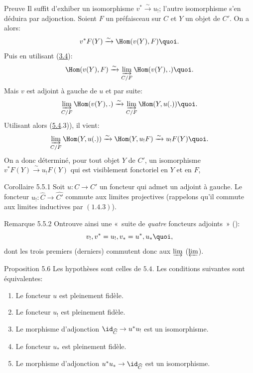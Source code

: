 \begin{enonce*}[remark]{Preuve}
Il suffit d'exhiber un isomorphisme $v^\ast\xrightarrow{\sim}
u_{!}$; l'autre isomorphisme s'en déduira par adjonction. Soient $F$
un préfaisceau sur $C$ et $Y$ un objet de $C'$. On a alors:
$$
v^\ast F(Y)\xrightarrow{\sim} \Hom(v(Y),F){\quoi}.
$$
Puis en utilisant (\hyperref[I.prop3.4]{3.4}):
$$
\Hom(v(Y),F)\xrightarrow{\sim} \varinjlim_{C/F} \Hom(v(Y),.){\quoi}.
$$
Mais $v$ est adjoint à gauche de $u$ et par suite:
$$
\varinjlim_{C/F}\Hom(v(Y),.)\xrightarrow{\sim}\varinjlim_{C/F}\Hom(Y,u(.)){\quoi}.
$$
Utilisant alors (\hyperref[I.prop5.4]{5.4}.3)), il vient:
$$
\varinjlim_{C/F}\Hom(Y,u(.))\xrightarrow{\sim}
\Hom(Y,u_{!}F)\xrightarrow{\sim} u_{!}F(Y){\quoi}.
$$
On a donc déterminé, pour tout objet $Y$ de $C'$, un isomorphisme
$v^\ast F(Y)\xrightarrow{\sim} u_{!}F(Y)$ qui est visiblement
fonctoriel en $Y$ et en $F$, \cqfd
\end{enonce*}

\begin{enonce*}{Corollaire 5.5.1}
Soit $u:C\rightarrow C'$ un foncteur qui admet un adjoint à gauche.
Le foncteur $u_{!}:\widehat{C}\rightarrow
\widehat{C'}$ commute aux limites projectives
(rappelons qu'il commute aux limites inductives par $(1.4.3)$).
\end{enonce*}

\begin{enonce*}[remark]{Remarque 5.5.2}
On\pageoriginale trouve ainsi une « suite de \emph{quatre}
foncteurs adjoints » ():
$$
v_{!}, v^\ast=u_{!}, v_\ast = u^\ast, u_\ast{\quoi},
$$
dont les trois premiers (\resp  derniers) commutent donc aux
$\varinjlim$ (\resp  $\varprojlim$).
\end{enonce*}

\begin{enonce*}{Proposition 5.6}
Les hypothèses sont celles de $\hyperref[I.prop5.4]{5.4}$. Les conditions
suivantes sont équivalentes:
\begin{enumerate}
\renewcommand{\theenumi}{\roman{enumi}}
\renewcommand{\labelenumi}{\theenumi)}
\item Le foncteur $u$ est pleinement fidèle.

\item Le foncteur $u_{!}$ est pleinement fidèle.

\item Le morphisme d'adjonction
  $\id_{\widehat{C}}\rightarrow u^\ast u_{!}$ est un
  isomorphisme.

\item Le foncteur $u_\ast$ est pleinement fidèle.

\item Le morphisme d'adjonction $u^\ast u_\ast\rightarrow
  \id_{\widehat{C}}$ est un isomorphisme.
\end{enumerate}
\end{enonce*}

